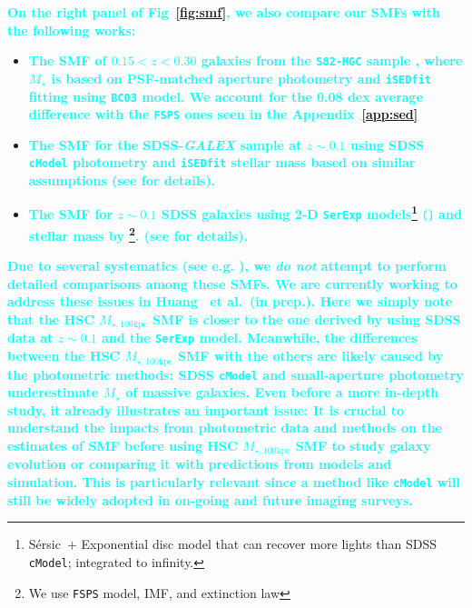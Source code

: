 \documentclass[fleqn,usenatbib]{mnras}
\def\etal{{\ et al.~}}
\def\ser{{S\'{e}rsic\ }}
\def\cmodel{\texttt{cModel}}
\def\mstar{{$M_{\star}$}}
\def\mtot{{$M_{\star,100\mathrm{kpc}}$}}
\newcommand{\song}[1]{\textcolor{cyan}{\textbf{#1}}}
\begin{document}
    \song{
    On the right panel of Fig~\ref{fig:smf}, we also compare our SMFs with the 
    following works:
    }

    \begin{itemize}

        \item \song{
            The SMF of $0.15 < z < 0.30$ galaxies from the \texttt{S82-MGC} sample
            \citep{Leauthaud2016}, where \mstar{} is based on PSF-matched aperture
            photometry and \texttt{iSEDfit} fitting using \texttt{BC03} model.
            We account for the 0.08 dex average difference with the \texttt{FSPS} 
            ones seen in the Appendix~\ref{app:sed}
            }
       
        \item \song{
            The SMF for the SDSS-\textit{GALEX} sample at $z{\sim} 0.1$ using 
            SDSS \cmodel{} photometry and \texttt{iSEDfit} stellar mass based on 
            similar assumptions (see \citet{Moustakas13} for details). 
            }
            
        \item \song{
            The SMF for $z{\sim} 0.1$ SDSS galaxies using 2-D \texttt{SerExp} 
            models\footnote{\ser{}$+$ Exponential disc model that can recover more 
            lights than SDSS \cmodel{}; integrated to infinity.}
            (\citealt{Bernardi2013, Meert2015}) and stellar mass by 
            \citet{Mendel2014}\footnote{We use \texttt{FSPS} model, 
            \citet{Chabrier2003} IMF, and \citet{Calzetti2000} extinction law}.
            (see \citet{Bernardi2017} for details).
            }
            
    \end{itemize}
    
    \song{ 
    Due to several systematics (see e.g. \citealt{Bernardi2013, Bernardi2017}), we 
    \emph{do not} attempt to perform detailed comparisons among these SMFs.
    We are currently working to address these issues in Huang \etal (in prep.). 
    Here we simply note that the HSC \mtot{} SMF is closer to the one 
    derived by \citet{Bernardi2017} using SDSS data at $z{\sim}0.1$ and the 
    \texttt{SerExp} model.
    Meanwhile, the differences between the HSC \mtot{} SMF with the others are 
    likely caused by the photometric methods: SDSS \cmodel{} and small-aperture 
    photometry underestimate \mstar{} of massive galaxies.  
    Even before a more in-depth study, it already illustrates an important issue:
    \textbf{It is crucial to understand the impacts from photometric data and 
    methods on the estimates of SMF} before using HSC \mtot{} SMF to study 
    galaxy evolution or 
    comparing it with predictions from models and simulation. 
    This is particularly relevant since a method like \cmodel{} will still be 
    widely adopted in on-going and future imaging surveys.
    }  
    
\end{document}
